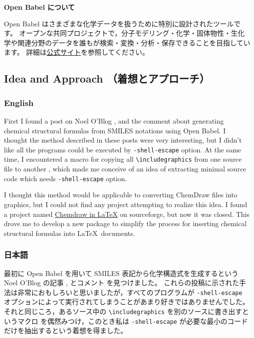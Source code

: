 \documentclass[12pt]{jsarticle}
\begin{document}
\noindent \textbf{Open Babel について}

Open Babel はさまざまな化学データを扱うために特別に設計されたツールです。
オープンな共同プロジェクトで，分子モデリング・化学・固体物性・生化学や関連分野のデータを誰もが検索・変換・分析・保存できることを目指しています。
詳細は\href{http://openbabel.org/}{公式サイト}を参照してください。

\clearpage

\subsection{Idea and Approach （着想とアプローチ）}

\subsubsection{English}
First I found a post on Noel O'Blog \cite{NOB1}, \cite{NOB2} and the comment \cite{JLA} about generating chemical structural formulas from SMILES notations using Open Babel.
I thought the method described in these posts were very interesting, but I didn't like all the programs could be executed by \verb|-shell-escape| option.
At the same time, I encountered a macro for copying all \verb|\includegraphics| from one source file to another \cite{OKU}, which made me conceive of an idea of extracting minimal source code which needs \verb|-shell-escape| option.

I thought this method would be applicable to converting ChemDraw files into graphics, but I could not find any project attempting to realize this idea.
I found a project named \href{http://chemdrawinlatex.sourceforge.net/}{Chemdraw in \LaTeX} on sourceforge, but now it was closed.
This drove me to develop a new package to simplify the process for inserting chemical structural formulas into \LaTeX\ documents.

\subsubsection{日本語}

最初に Open Babel を用いて SMILES 表記から化学構造式を生成するという Noel O'Blog の記事 \cite{NOB1}, \cite{NOB2} とコメント \cite{JLA} を見つけました。
これらの投稿に示された手法は非常におもしろいと思いましたが，すべてのプログラムが \verb|-shell-escape| オプションによって実行されてしまうことがあまり好きではありませんでした。
それと同じころ，あるソース中の \verb|\includegraphics| を別のソースに書き出すというマクロ \cite{OKU} を偶然みつけ，このとき私は \verb|-shell-escape| が必要な最小のコードだけを抽出するという着想を得ました。
\end{document}
